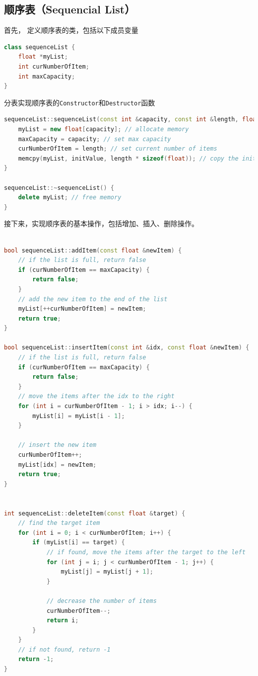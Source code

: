 \documentclass{csexp}
\begin{document}
\subsection{顺序表（Sequencial List）}

首先， 定义顺序表的类，包括以下成员变量
\begin{lstlisting}[language=C++]
class sequenceList {
    float *myList;
    int curNumberOfItem;
    int maxCapacity;
}
\end{lstlisting}

分表实现顺序表的\texttt{Constructor}和\texttt{Destructor}函数

\begin{lstlisting}[language=C++]
sequenceList::sequenceList(const int &capacity, const int &length, float initValue[]) {
    myList = new float[capacity]; // allocate memory
    maxCapacity = capacity; // set max capacity
    curNumberOfItem = length; // set current number of items
    memcpy(myList, initValue, length * sizeof(float)); // copy the initial values
}

sequenceList::~sequenceList() {
    delete myList; // free memory
}
\end{lstlisting}

接下来，实现顺序表的基本操作，包括增加、插入、删除操作。

\begin{lstlisting}[language=C++]

bool sequenceList::addItem(const float &newItem) {
    // if the list is full, return false
    if (curNumberOfItem == maxCapacity) {
        return false;
    }
    // add the new item to the end of the list
    myList[++curNumberOfItem] = newItem;
    return true;
}

bool sequenceList::insertItem(const int &idx, const float &newItem) {
    // if the list is full, return false
    if (curNumberOfItem == maxCapacity) {
        return false;
    }
    // move the items after the idx to the right
    for (int i = curNumberOfItem - 1; i > idx; i--) {
        myList[i] = myList[i - 1];
    }
    
    // insert the new item
    curNumberOfItem++;
    myList[idx] = newItem;
    return true;
}


int sequenceList::deleteItem(const float &target) {
    // find the target item
    for (int i = 0; i < curNumberOfItem; i++) {
        if (myList[i] == target) {
            // if found, move the items after the target to the left
            for (int j = i; j < curNumberOfItem - 1; j++) {
                myList[j] = myList[j + 1];
            }

            // decrease the number of items
            curNumberOfItem--;
            return i;
        }
    }
    // if not found, return -1
    return -1;
}
\end{lstlisting}
\end{document}
